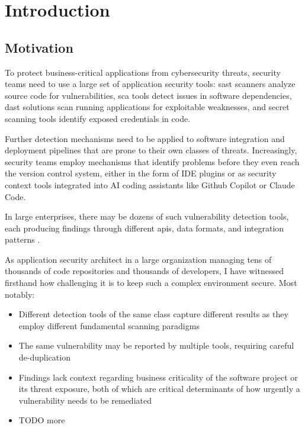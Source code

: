 \chapter*{Introduction}

\section*{Motivation}

To protect business-critical applications from cybersecurity threats, security teams need to use a large set of application security tools: \gls{sast} scanners analyze source code for vulnerabilities, \gls{sca} tools detect issues in software dependencies, \gls{dast} solutions scan running applications for exploitable weaknesses, and secret scanning tools identify exposed credentials in code.

Further detection mechanisms need to be applied to software integration and deployment pipelines that are prone to their own classes of threats. Increasingly, security teams employ mechanisms that identify problems before they even reach the version control system, either in the form of IDE plugins or as security context tools integrated into AI coding assistants like Github Copilot or Claude Code.

In large enterprises, there may be dozens of such vulnerability detection tools, each producing findings through different \glspl{api}, data formats, and integration patterns \parencite{Anderson2020, Stallings2024}.

As application security architect in a large organization managing tens of thousands of code repositories and thousands of developers, I have witnessed firsthand how challenging it is to keep such a complex environment secure. Most notably:
\begin{itemize}
    \item Different detection tools of the same class capture different results as they employ different fundamental scanning paradigms
    \item The same vulnerability may be reported by multiple tools, requiring careful de-duplication
    \item Findings lack context regarding business criticality of the software project or its threat exposure, both of which are critical determinants of how urgently a vulnerability needs to be remediated
    \item TODO more
\end{itemize}

